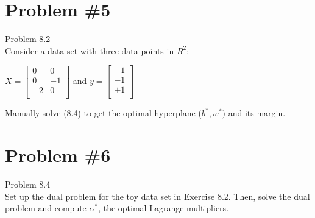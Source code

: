 \documentclass[12pt]{article}
\begin{document}
	\section*{Problem \#5}
	Problem 8.2 \\
	Consider a data set with three data points in $R^2$: \\
	\begin{center}
		$X = \left[
		\begin{array}{cc}
		0 & 0 \\
		0 &-1 \\
		-2 & 0 \\
		\end{array}
		\right]$ and $y = \left[ 
		\begin{array}{c}
		-1\\
		-1\\
		+1\\
		\end{array} \right]$
	\end{center}
	Manually solve (8.4) to get the optimal hyperplane ($b^* , w^* )$ and its margin.
	
	\section*{Problem \#6}
	Problem 8.4 \\
	Set up the dual problem for the toy data set in Exercise 8.2. Then, solve the dual problem and compute $\alpha^*$, the optimal Lagrange
	multipliers.
	
\end{document}
